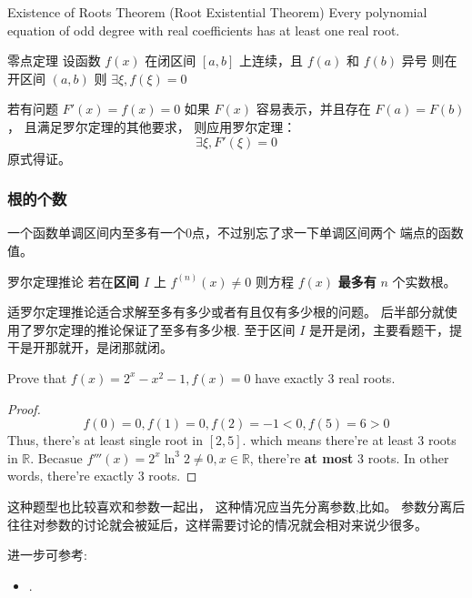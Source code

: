 \begin{definition} {Existence of Roots Theorem (Root Existential Theorem)} 
    Every polynomial equation of odd degree with real coefficients has at least one real root.
\end{definition}
\begin{definition}{零点定理}
    设函数 $f(x)$ 在闭区间 $\left[a, b\right]$ 上连续，且 $f(a)$ 和 $f(b)$ 异号
    则在开区间 $\left(a, b\right)$ 则 $\exists \xi, f(\xi) = 0$
\end{definition}

若有问题 $F'(x) = f(x) = 0$ 如果 $F(x)$ 容易表示，并且存在 $F(a)=F(b)$，
且满足罗尔定理的其他要求，
则应用罗尔定理：
\[
    \exists \xi, F'(\xi) = 0
\]
原式得证。

\subsubsection{根的个数} \label{number-of-roots-question}

一个函数单调区间内至多有一个0点，不过别忘了求一下单调区间两个
端点的函数值。

\begin{lemma}{罗尔定理推论}
    若在\textbf{区间 $I$} 上 $f^{(n)}(x) \neq 0$ 
    则方程 $f(x)$ \textbf{最多有} $n$ 个实数根。
\end{lemma}
适罗尔定理推论适合求解至多有多少或者有且仅有多少根的问题。
后半部分就使用了罗尔定理的推论保证了至多有多少根.
至于区间 $I$ 是开是闭，主要看题干，提干是开那就开，是闭那就闭。

\begin{example}{\cite[page 77, pdf 88，例4]{we}}
    \label{ex:special-val-substitution}
    Prove that $f(x) = 2^x - x^2 - 1, f(x) = 0$ have exactly 3 real roots.
    \begin{proof}
        \[
            f(0) = 0, f(1) = 0, f(2) = -1 < 0, f(5) = 6 > 0
        \]
        Thus, there's at least single root in $[2, 5]$. 
        which means there're at least 3 roots in $\mathbb{R}$.
        Becasue $f'''(x) = 2^x \ln ^3 2 \neq 0, x \in \mathbb{R}$, there're \textbf{at most}
        3 roots.
        In other words, there're exactly 3 roots.
    \end{proof}
\end{example}

这种题型也比较喜欢和参数一起出，
这种情况应当先分离参数,比如\cite[page 77, pdf 88, 例5]{we}。
参数分离后往往对参数的讨论就会被延后，这样需要讨论的情况就会相对来说少很多。

进一步可参考:
\begin{itemize}
    \item \cite[page 85, pdf 96, example 6]{we}.
\end{itemize}


